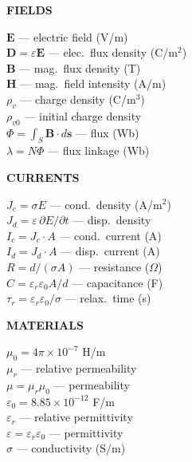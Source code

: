 \documentclass[6pt,letterpaper]{article}
\newcommand{\shead}[3]{%
  \noindent\colorbox{#1}{\parbox{\dimexpr\linewidth-2\fboxsep\relax}%
  {\color{#2}\bfseries\fontsize{6}{7}\selectfont #3}}\vspace{0.5pt}}
\begin{document}
\vfill
\vspace{2pt}
\noindent
\begin{minipage}[t]{0.19\linewidth}
\shead{purplebg}{purple}{FIELDS}
\begin{ebox}
$\mathbf{E}$ — electric field (V/m)\\
$\mathbf{D}=\varepsilon\mathbf{E}$ — elec.\ flux density (C/m$^2$)\\
$\mathbf{B}$ — mag.\ flux density (T)\\
$\mathbf{H}$ — mag.\ field intensity (A/m)\\
$\rho_v$ — charge density (C/m$^3$)\\
$\rho_{v0}$ — initial charge density\\
$\Phi=\int_S\mathbf{B}\cdot d\mathbf{s}$ — flux (Wb)\\
$\lambda=N\Phi$ — flux linkage (Wb)
\end{ebox}
\end{minipage}\hfill
\begin{minipage}[t]{0.19\linewidth}
\shead{tealbg}{teal}{CURRENTS}
\begin{ebox}
$J_c=\sigma E$ — cond.\ density (A/m$^2$)\\
$J_d=\varepsilon\,\partial E/\partial t$ — disp.\ density\\
$I_c=J_c\cdot A$ — cond.\ current (A)\\
$I_d=J_d\cdot A$ — disp.\ current (A)\\
$R=d/(\sigma A)$ — resistance ($\Omega$)\\
$C=\varepsilon_r\varepsilon_0 A/d$ — capacitance (F)\\
$\tau_r=\varepsilon_r\varepsilon_0/\sigma$ — relax.\ time (s)
\end{ebox}
\end{minipage}\hfill
\begin{minipage}[t]{0.19\linewidth}
\shead{coralbg}{coral}{MATERIALS}
\begin{ebox}
$\mu_0=4\pi\!\times\!10^{-7}$ H/m\\
$\mu_r$ — relative permeability\\
$\mu=\mu_r\mu_0$ — permeability\\[2pt]
$\varepsilon_0=8.85\!\times\!10^{-12}$ F/m\\
$\varepsilon_r$ — relative permittivity\\
$\varepsilon=\varepsilon_r\varepsilon_0$ — permittivity\\[2pt]
$\sigma$ — conductivity (S/m)
\end{ebox}
\end{minipage}\hfill
\end{document}
